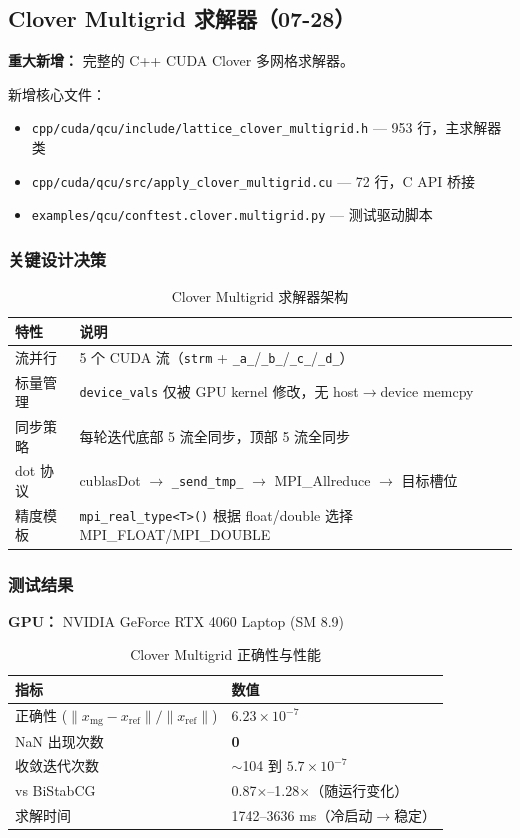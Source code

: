 \documentclass[11pt,a4paper]{article}
\begin{document}
\subsection{Clover Multigrid 求解器（07-28）}

\textbf{重大新增：} 完整的 C++ CUDA Clover 多网格求解器。

新增核心文件：
\begin{itemize}
    \item \texttt{cpp/cuda/qcu/include/lattice\_clover\_multigrid.h} — 953 行，主求解器类
    \item \texttt{cpp/cuda/qcu/src/apply\_clover\_multigrid.cu} — 72 行，C API 桥接
    \item \texttt{examples/qcu/conftest.clover.multigrid.py} — 测试驱动脚本
\end{itemize}

\subsubsection{关键设计决策}

\begin{table}[ht]
\centering
\caption{Clover Multigrid 求解器架构}
\begin{tabular}{ll}
\toprule
特性 & 说明 \\
\midrule
流并行 & 5 个 CUDA 流（\texttt{strm} + \texttt{\_a\_}/\texttt{\_b\_}/\texttt{\_c\_}/\texttt{\_d\_}） \\
标量管理 & \texttt{device\_vals} 仅被 GPU kernel 修改，无 host$\rightarrow$device memcpy \\
同步策略 & 每轮迭代底部 5 流全同步，顶部 5 流全同步 \\
dot 协议 & cublasDot $\rightarrow$ \texttt{\_send\_tmp\_} $\rightarrow$ MPI\_Allreduce $\rightarrow$ 目标槽位 \\
精度模板 & \texttt{mpi\_real\_type<T>()} 根据 float/double 选择 MPI\_FLOAT/MPI\_DOUBLE \\
\bottomrule
\end{tabular}
\end{table}

\subsubsection{测试结果}

\textbf{GPU：} NVIDIA GeForce RTX 4060 Laptop (SM 8.9)

\begin{table}[ht]
\centering
\caption{Clover Multigrid 正确性与性能}
\begin{tabular}{ll}
\toprule
指标 & 数值 \\
\midrule
正确性 ($\|x_{\text{mg}}-x_{\text{ref}}\|/\|x_{\text{ref}}\|$) & \textbf{$6.23\times10^{-7}$} \\
NaN 出现次数 & \textbf{0} \\
收敛迭代次数 & $\sim$104 到 $5.7\times10^{-7}$ \\
vs BiStabCG & 0.87$\times$--1.28$\times$（随运行变化）\\
求解时间 & 1742--3636 ms（冷启动$\rightarrow$稳定）\\
\bottomrule
\end{tabular}
\end{table}
\end{document}
